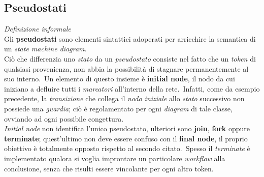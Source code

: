 \documentclass{article}
\begin{document}
\subsection*{Pseudostati}
\large
\textit{Definizione informale}\\Gli \textbf{pseudostati} sono elementi sintattici adoperati per arricchire la semantica di un \textit{state machine diagram}.\vspace*{14pt}\\
Ciò che differenzia uno \textit{stato} da un \textit{pseudostato} consiste nel fatto che un \textit{token} di qualsiasi provenienza, non abbia la possibilità di stagnare permanentemente al suo interno.\ Un elemento di questo insieme è \textbf{initial node}, il nodo da cui iniziano a defluire tutti i \textit{marcatori} all'interno della rete.\ Infatti, come da esempio precedente, la \textit{transizione} che collega il \textit{nodo iniziale} allo \textit{stato} successivo non possiede una \textit{guardia}; ciò è regolamentato per ogni \textit{diagram} di tale classe, ovviando ad ogni possibile congettura.\vspace*{14pt}\\
\textit{Initial node} non identifica l'unico pseudostato, ulteriori sono \textbf{join}, \textbf{fork} oppure \textbf{terminate}; quest'ultimo non deve essere confuso con il \textbf{final node}, il proprio obiettivo è totalmente opposto rispetto al secondo citato.\ Spesso il \textit{terminate} è implementato qualora si voglia improntare un particolare \textit{workflow} alla conclusione, senza che risulti essere vincolante per ogni altro token.\vspace*{14pt}\\
\end{document}
